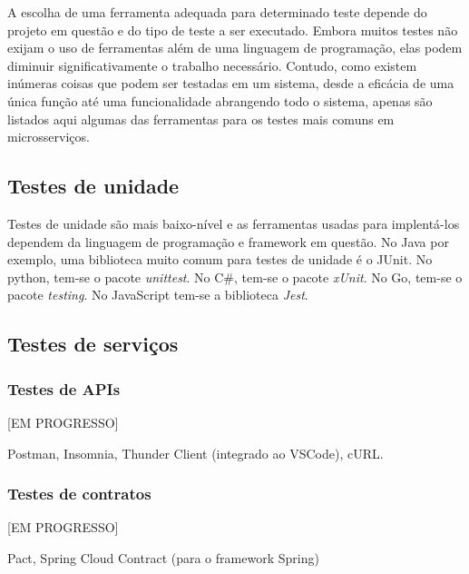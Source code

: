 A escolha de uma ferramenta adequada para determinado teste depende do projeto em questão e do tipo de teste a ser executado. Embora muitos testes não exijam o uso de ferramentas além de uma linguagem de programação, elas podem diminuir significativamente o trabalho necessário. Contudo, como existem inúmeras coisas que podem ser testadas em um sistema, desde a eficácia de uma única função até uma funcionalidade abrangendo todo o sistema, apenas são listados aqui algumas das ferramentas para os testes mais comuns em microsserviços.

\subsection{Testes de unidade}
Testes de unidade são mais baixo-nível e as ferramentas usadas para implentá-los dependem da linguagem de programação e framework em questão. No Java por exemplo, uma biblioteca muito comum para testes de unidade é o JUnit. No python, tem-se o pacote \emph{unittest}. No C\#, tem-se o pacote \emph{xUnit}. No Go, tem-se o pacote \emph{testing}. No JavaScript tem-se a biblioteca \emph{Jest}.

\subsection{Testes de serviços}

\subsubsection*{Testes de APIs}
[EM PROGRESSO]

Postman, Insomnia, Thunder Client (integrado ao VSCode), cURL.

\subsubsection*{Testes de contratos}
[EM PROGRESSO]

Pact, Spring Cloud Contract (para o framework Spring)


